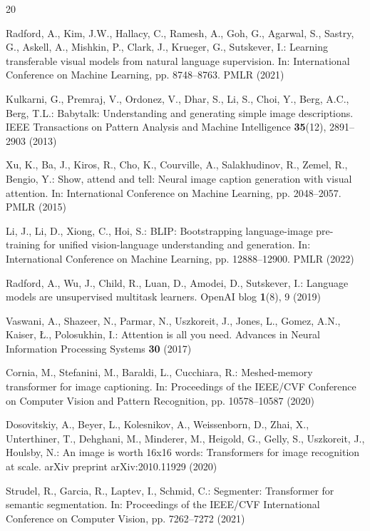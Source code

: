 \documentclass[runningheads]{llncs}
\begin{document}
\begin{thebibliography}{20}

Radford, A., Kim, J.W., Hallacy, C., Ramesh, A., Goh, G., Agarwal, S., Sastry, G., Askell, A., Mishkin, P., Clark, J., Krueger, G., Sutskever, I.: Learning transferable visual models from natural language supervision. In: International Conference on Machine Learning, pp. 8748--8763. PMLR (2021)

Kulkarni, G., Premraj, V., Ordonez, V., Dhar, S., Li, S., Choi, Y., Berg, A.C., Berg, T.L.: Babytalk: Understanding and generating simple image descriptions. IEEE Transactions on Pattern Analysis and Machine Intelligence \textbf{35}(12), 2891--2903 (2013)

Xu, K., Ba, J., Kiros, R., Cho, K., Courville, A., Salakhudinov, R., Zemel, R., Bengio, Y.: Show, attend and tell: Neural image caption generation with visual attention. In: International Conference on Machine Learning, pp. 2048--2057. PMLR (2015)

Li, J., Li, D., Xiong, C., Hoi, S.: BLIP: Bootstrapping language-image pre-training for unified vision-language understanding and generation. In: International Conference on Machine Learning, pp. 12888--12900. PMLR (2022)

Radford, A., Wu, J., Child, R., Luan, D., Amodei, D., Sutskever, I.: Language models are unsupervised multitask learners. OpenAI blog \textbf{1}(8), 9 (2019)

Vaswani, A., Shazeer, N., Parmar, N., Uszkoreit, J., Jones, L., Gomez, A.N., Kaiser, Ł., Polosukhin, I.: Attention is all you need. Advances in Neural Information Processing Systems \textbf{30} (2017)

Cornia, M., Stefanini, M., Baraldi, L., Cucchiara, R.: Meshed-memory transformer for image captioning. In: Proceedings of the IEEE/CVF Conference on Computer Vision and Pattern Recognition, pp. 10578--10587 (2020)

Dosovitskiy, A., Beyer, L., Kolesnikov, A., Weissenborn, D., Zhai, X., Unterthiner, T., Dehghani, M., Minderer, M., Heigold, G., Gelly, S., Uszkoreit, J., Houlsby, N.: An image is worth 16x16 words: Transformers for image recognition at scale. arXiv preprint arXiv:2010.11929 (2020)

Strudel, R., Garcia, R., Laptev, I., Schmid, C.: Segmenter: Transformer for semantic segmentation. In: Proceedings of the IEEE/CVF International Conference on Computer Vision, pp. 7262--7272 (2021)


\end{thebibliography}
\end{document}
